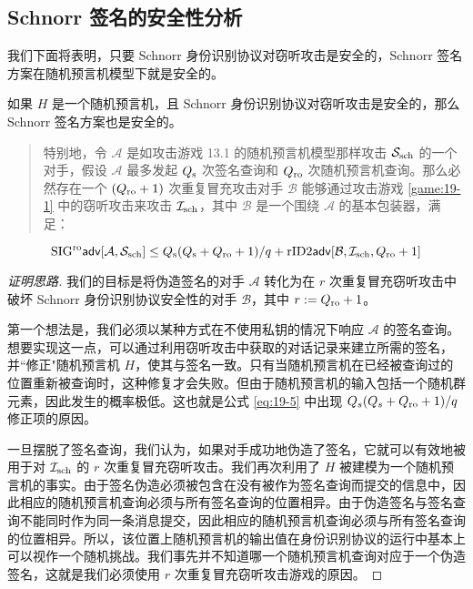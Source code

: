 \subsection{Schnorr 签名的安全性分析}

我们下面将表明，只要 Schnorr 身份识别协议对窃听攻击是安全的，Schnorr 签名方案在随机预言机模型下就是安全的。

\begin{theorem}\label{theo:19-7}
如果 $H$ 是一个随机预言机，且 Schnorr 身份识别协议对窃听攻击是安全的，那么 Schnorr 签名方案也是安全的。

\begin{quote}
特别地，令 $\mathcal{A}$ 是如攻击游戏 13.1 的随机预言机模型那样攻击  $\mathcal{S}_{\rm sch}$ 的一个对手，假设 $\mathcal{A}$ 最多发起 $Q_{\rm s}$ 次签名查询和 $Q_{\rm ro}$ 次随机预言机查询。那么必然存在一个 $(Q_{\rm ro}+1)$ 次重复冒充攻击对手 $\mathcal{B}$ 能够通过攻击游戏 \ref{game:19-1} 中的窃听攻击来攻击  $\mathcal{I}_{\rm sch}$，其中 $\mathcal{B}$ 是一个围绕 $\mathcal{A}$ 的基本包装器，满足：
\end{quote}
\begin{equation}\label{eq:19-5}
{\rm SIG^{ro}\mathsf{adv}}[\mathcal{A}, \mathcal{S}_{\rm sch}]\leq{Q_{\rm s}(Q_{\rm s}+Q_{\rm ro}+1)}/{q}+{\rm rID2\mathsf{adv}}[\mathcal{B},\mathcal{I}_{\rm sch},Q_{\rm ro}+1]
\end{equation}
\end{theorem}

\begin{proof}[证明思路]
我们的目标是将伪造签名的对手 $\mathcal{A}$ 转化为在 $r$ 次重复冒充窃听攻击中破坏 Schnorr 身份识别协议安全性的对手 $\mathcal{B}$，其中 $r:=Q_{\rm ro}+1$。

第一个想法是，我们必须以某种方式在不使用私钥的情况下响应 $\mathcal{A}$ 的签名查询。想要实现这一点，可以通过利用窃听攻击中获取的对话记录来建立所需的签名，并``修正"随机预言机 $H$，使其与签名一致。只有当随机预言机在已经被查询过的位置重新被查询时，这种修复才会失败。但由于随机预言机的输入包括一个随机群元素，因此发生的概率极低。这也就是公式 \ref{eq:19-5} 中出现 ${Q_s(Q_s+Q_{\rm ro}+1)}/{q}$ 修正项的原因。

一旦摆脱了签名查询，我们认为，如果对手成功地伪造了签名，它就可以有效地被用于对  $\mathcal{I}_{\rm sch}$ 的 $r$ 次重复冒充窃听攻击。我们再次利用了 $H$ 被建模为一个随机预言机的事实。由于签名伪造必须被包含在没有被作为签名查询而提交的信息中，因此相应的随机预言机查询必须与所有签名查询的位置相异。由于伪造签名与签名查询不能同时作为同一条消息提交，因此相应的随机预言机查询必须与所有签名查询的位置相异。所以，该位置上随机预言机的输出值在身份识别协议的运行中基本上可以视作一个随机挑战。我们事先并不知道哪一个随机预言机查询对应于一个伪造签名，这就是我们必须使用 $r$ 次重复冒充窃听攻击游戏的原因。
\end{proof}

